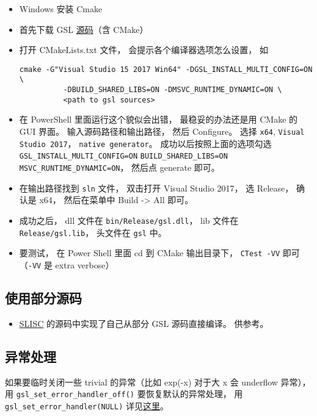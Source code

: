 \begin{itemize}
\item Windows 安装 Cmake
\item 首先下载 GSL \href{https://github.com/ampl/gsl}{源码}（含 CMake）
\item 打开 CMakeLists.txt 文件， 会提示各个编译器选项怎么设置， 如
\begin{lstlisting}[language=none]
    cmake -G"Visual Studio 15 2017 Win64" -DGSL_INSTALL_MULTI_CONFIG=ON \
          -DBUILD_SHARED_LIBS=ON -DMSVC_RUNTIME_DYNAMIC=ON \
          <path to gsl sources>
\end{lstlisting}
\item 在 PowerShell 里面运行这个貌似会出错， 最稳妥的办法还是用 CMake 的 GUI 界面。 输入源码路径和输出路径， 然后 Configure。 选择 \verb`x64`, \verb`Visual Studio 2017`， \verb`native generator`。 成功以后按照上面的选项勾选 \verb`GSL_INSTALL_MULTI_CONFIG=ON` \verb`BUILD_SHARED_LIBS=ON` \verb`MSVC_RUNTIME_DYNAMIC=ON`， 然后点 generate 即可。
\item 在输出路径找到 \verb`sln` 文件， 双击打开 Visual Studio 2017， 选 Release， 确认是 x64， 然后在菜单中 Build -> All 即可。

\item 成功之后， dll 文件在 \verb`bin/Release/gsl.dll`， lib 文件在 \verb`Release/gsl.lib`， 头文件在 \verb`gsl` 中。
\item 要测试， 在 Power Shell 里面 cd 到 CMake 输出目录下， \verb`CTest -VV` 即可 （\verb`-VV` 是 extra verbose）
\end{itemize}

\subsection{使用部分源码}
\begin{itemize}
\item \href{https://github.com/MacroUniverse/SLISC}{SLISC} 的源码中实现了自己从部分 GSL 源码直接编译。 供参考。
\end{itemize}

\subsection{异常处理}
如果要临时关闭一些 trivial 的异常（比如 exp(-x) 对于大 x 会 underflow 异常）， 用 \verb|gsl_set_error_handler_off()|
要恢复默认的异常处理， 用 \verb|gsl_set_error_handler(NULL)|
详见\href{https://www.gnu.org/software/gsl/doc/html/err.html}{这里}。
